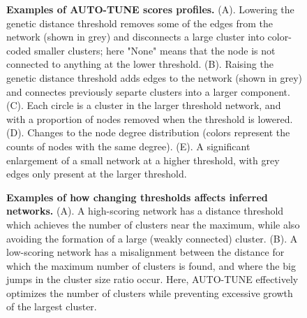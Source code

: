 \documentclass[utf8]{FrontiersinHarvard} %
\begin{document}
\begin{figure}[h]
	\centering
	\vspace{0.01in}
	\caption{\textbf{Examples of AUTO-TUNE scores profiles.}
		(A). Lowering the genetic distance threshold removes some of the edges from the network (shown in grey) and disconnects a large cluster into color-coded smaller clusters; here "None" means that the node is not connected to anything at the lower threshold. (B). Raising the genetic distance threshold adds edges to the network (shown in grey) and connectes previously separte clusters into a larger component. (C). Each circle is a cluster in the larger threshold network, and with a proportion of nodes removed when the threshold is lowered. (D). Changes to the node degree distribution (colors represent the counts of nodes with the same degree). (E). A significant enlargement of a small network at a higher threshold, with grey edges only present at the larger threshold. }
	\label{fig:examples}
\end{figure}

\begin{figure}[h]
	\centering
	\vspace{0.01in}
	\caption{\textbf{Examples of how changing thresholds affects inferred networks.}
		(A). A high-scoring network \cite{bbosa_short_2020} has a distance threshold which achieves the number of clusters near the maximum, while also avoiding the formation of a large (weakly connected) cluster. (B). A low-scoring network \cite{liu_dynamics_2020} has a misalignment between the distance for which the maximum number of clusters is found, and where the big jumps in the cluster size ratio occur. Here, AUTO-TUNE effectively optimizes the number of clusters while preventing excessive growth of the largest cluster.}
	\label{fig:cases}
\end{figure}
\end{document}
